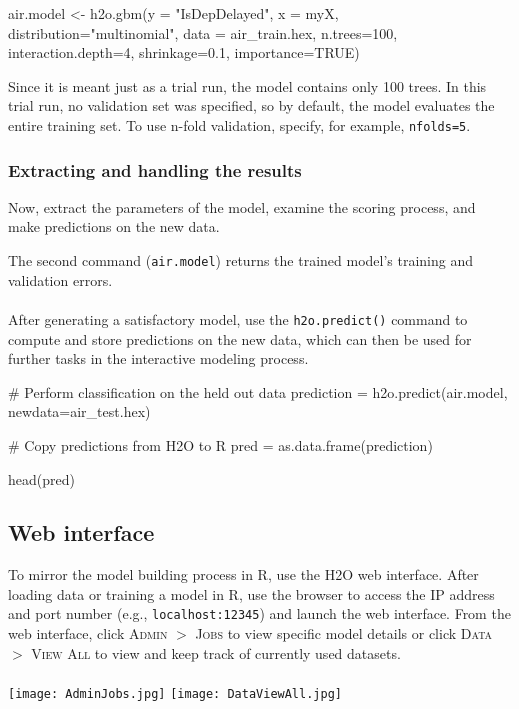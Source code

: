\documentclass{article}[11pt]
\begin{document}
{\begin{spverbatim}
air.model <- h2o.gbm(y = "IsDepDelayed", x = myX, 
                   distribution="multinomial", 
                   data = air_train.hex, n.trees=100, 
                   interaction.depth=4, 
                   shrinkage=0.1,
                   importance=TRUE)
                   
\end{spverbatim}
\noindent
Since it is meant just as a trial run, the model contains only 100 trees. In this trial run, no validation set was specified, so by default, the model evaluates the entire training set.  To use n-fold validation, specify, for example, \texttt{nfolds=5}. 

\subsubsection{Extracting and handling the results}  

Now, extract the parameters of the model, examine the scoring process, and make predictions on the new data.

\noindent
The second command ({\texttt{air.model}}) returns the trained model's training and validation errors. 
\\
\\
After generating a satisfactory model, use the \texttt{h2o.predict()} command to compute and store predictions on the new data, which can then be used for further tasks in the interactive modeling process.
\begin{spverbatim}
# Perform classification on the held out data
prediction = h2o.predict(air.model, newdata=air_test.hex)

# Copy predictions from H2O to R
pred = as.data.frame(prediction)

head(pred)

\end{spverbatim}


\subsection{Web interface} 

To mirror the model building process in R, use the H2O web interface. After loading data or training a model in R, use the browser to access the IP address and port number (e.g., {\texttt{localhost:12345}}) and launch the web interface. From the web interface, click  \textsc{Admin} $>$ \textsc{Jobs} to view specific model details or click  \textsc{Data} $>$ \textsc{View All} to view and keep track of currently used datasets. 
\\
\\
\texttt{[image: AdminJobs.jpg]} \texttt{[image: DataViewAll.jpg]}

}
\end{document}
